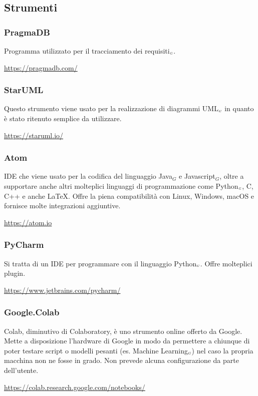 \subsection{Strumenti}\label{ProcessiPrimariStrumenti}

\subsubsection{PragmaDB}\label{ProcessiPrimariStrumentiPragmaDB}
Programma utilizzato per il tracciamento dei requisiti$_{\scaleto{G}{3pt}}$.
\begin{center}
	\url{https://pragmadb.com/}
\end{center}
\subsubsection{StarUML}\label{ProcessiPrimariStrumentiDrawIo}
Questo strumento viene usato per la realizzazione di diagrammi UML$_{\scaleto{G}{3pt}}$ in quanto è stato ritenuto semplice da utilizzare.
\begin{center}
	\url{https://staruml.io/}
\end{center}
\subsubsection{Atom}\label{ProcessiPrimariStrumentiAtom}
IDE che viene usato per la codifica del linguaggio Java$_G$ e Javascript$_G$, oltre a supportare anche altri molteplici linguaggi di programmazione come Python$_{\scaleto{G}{3pt}}$, C, C++ e anche \LaTeX. Offre la piena compatibilità con Linux, Windows, macOS e fornisce molte integrazioni aggiuntive.
\begin{center}
	\url{https://atom.io}
\end{center}
\subsubsection{PyCharm}\label{ProcessiPrimariStrumentiPyCharm}
Si tratta di un IDE per programmare con il linguaggio Python$_{\scaleto{G}{3pt}}$.
Offre molteplici plugin.
\begin{center}
	\url{https://www.jetbrains.com/pycharm/}
\end{center}
\subsubsection{Google.Colab}\label{ProcessiPrimariStrumentiGoogleColab}
Colab, diminutivo di Colaboratory, è uno strumento online offerto da Google.
Mette a disposizione l'hardware di Google in modo da permettere a chiunque di poter testare script o modelli pesanti (es. Machine Learning$_{\scaleto{G}{3pt}}$) nel caso la propria macchina non ne fosse in grado.
Non prevede alcuna configurazione da parte dell'utente.
\begin{center}
	\url{https://colab.research.google.com/notebooks/}
\end{center}
